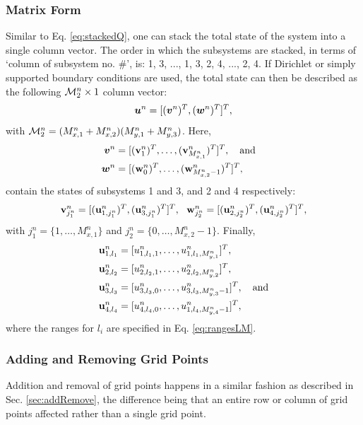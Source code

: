 \documentclass[fleqn]{jaes}
\begin{document}
\subsubsection{Matrix Form}
Similar to Eq. \eqref{eq:stackedQ}, one can stack the total state of the system into a single column vector. The order in which the subsystems are stacked, in terms of `column of subsystem no. \#', is: 1, 3, ..., 1, 3, 2, 4, ..., 2, 4. If Dirichlet or simply supported boundary conditions are used, the total state can then be described as the following ${\mathcal{M}_2^n} \times 1$ column vector:
\begin{equation}\label{eq:stacked2D}
     \uStack^n = [(\vv^n)^T, (\ww^n)^T]^T,
\end{equation}
with ${\mathcal{M}_2^n} =(M_{x, 1}^n + M_{x, 2}^n) (M_{y, 1}^n + M_{y, 3}^n)$. Here,
\begin{equation}\label{eq:vw}
\begin{aligned}
    \vv^n &= [(\v_{1}^n)^T,\hdots, (\v_{M_{x,1}^n}^n)^T]^T, \qaq\\
    \ww^n &= [(\w_{0}^n)^T, \hdots, (\w_{M_{x, 2}^n-1}^n)^T]^T,
\end{aligned}
\end{equation}
contain the states of subsystems 1 and 3, and 2 and 4 respectively:
\begin{equation*}
     \mathbf{v}_{j_1^n}^n = [(\mathbf{u}_{1, j_1^n}^n)^T, (\mathbf{u}_{3, j_1^n}^n)^T]^T, \ \ \mathbf{w}_{j_2^n}^n = [(\mathbf{u}_{2, j_2^n}^n)^T, (\mathbf{u}_{4, j_2^n}^n)^T]^T,
\end{equation*}
with $j_1^n = \{1, \hdots, M_{x,1}^n\}$ and $j_2^n = \{0, \hdots, M_{x,2}^n-1\}$. Finally, 
\begin{equation}\label{eq:2DuDefs}
    \begin{aligned}
         \u_{1,l_1}^n &= [u_{1, l_1, 1}^n, \hdots, u_{1, l_1, M_{y, 1}^n}^n]^T,
         \\
         \u_{2,l_2}^n &= [u_{2, l_2, 1}^n, \hdots, u_{2, l_2, M_{y, 2}^n}^n]^T,\\
         \u_{3,l_3}^n &= [u_{3, l_3, 0}^n, \hdots, u_{3, l_3, M_{y, 3}^n-1}^n]^T,\quad \text{and}\\
         \u_{4,l_4}^n &= [u_{4, l_4, 0}^n, \hdots, u_{1, l_4, M_{y, 4}^n-1}^n]^T,
     \end{aligned}
\end{equation}
where the ranges for $l_i$ are specified in Eq. \eqref{eq:rangesLM}.
\subsubsection{Adding and Removing Grid Points}
Addition and removal of grid points happens in a similar fashion as described in Sec. \ref{sec:addRemove}, the difference being that an entire row or column of grid points affected rather than a single grid point.
\end{document}
